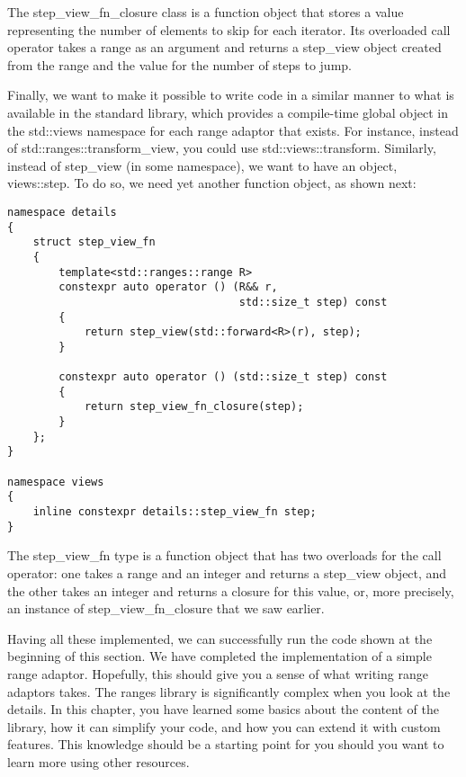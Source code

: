 The step\_view\_fn\_closure class is a function object that stores a value representing the number of elements to skip for each iterator. Its overloaded call operator takes a range as an argument and returns a step\_view object created from the range and the value for the number of steps to jump.

Finally, we want to make it possible to write code in a similar manner to what is available in the standard library, which provides a compile-time global object in the std::views namespace for each range adaptor that exists. For instance, instead of std::ranges::transform\_view, you could use std::views::transform. Similarly, instead of step\_view (in some namespace), we want to have an object, views::step. To do so, we need yet another function object, as shown next:

\begin{lstlisting}[style=styleCXX]
namespace details
{
	struct step_view_fn
	{
		template<std::ranges::range R>
		constexpr auto operator () (R&& r,
								    std::size_t step) const
		{
			return step_view(std::forward<R>(r), step);
		}
	
		constexpr auto operator () (std::size_t step) const
		{
			return step_view_fn_closure(step);
		}
	};
}

namespace views
{
	inline constexpr details::step_view_fn step;
}
\end{lstlisting}

The step\_view\_fn type is a function object that has two overloads for the call operator: one takes a range and an integer and returns a step\_view object, and the other takes an integer and returns a closure for this value, or, more precisely, an instance of step\_view\_fn\_closure that we saw earlier.

Having all these implemented, we can successfully run the code shown at the beginning of this section. We have completed the implementation of a simple range adaptor. Hopefully, this should give you a sense of what writing range adaptors takes. The ranges library is significantly complex when you look at the details. In this chapter, you have learned some basics about the content of the library, how it can simplify your code, and how you can extend it with custom features. This knowledge should be a starting point for you should you want to learn more using other resources.






























